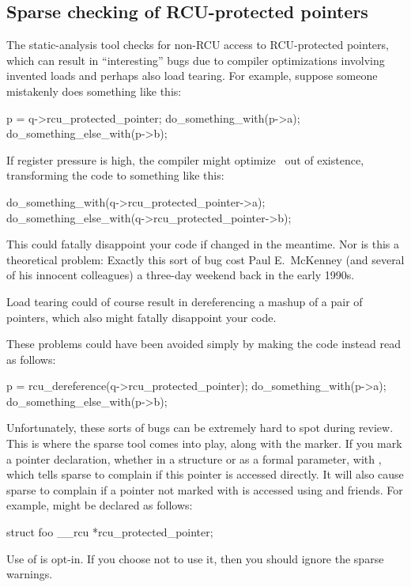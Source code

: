 \subsection{Sparse checking of RCU-protected pointers}
\label{sec:rcu:Sparse checking of RCU-protected pointers}

The  static-analysis tool checks for non-RCU access to RCU-protected
pointers, which can result in ``interesting'' bugs due to compiler
optimizations involving invented loads and perhaps also load tearing.
For example, suppose someone mistakenly does something like this:

\begin{VerbatimU}
	p = q->rcu_protected_pointer;
	do_something_with(p->a);
	do_something_else_with(p->b);
\end{VerbatimU}

If register pressure is high, the compiler might optimize~ out
of existence, transforming the code to something like this:

\begin{VerbatimU}
	do_something_with(q->rcu_protected_pointer->a);
	do_something_else_with(q->rcu_protected_pointer->b);
\end{VerbatimU}

This could fatally disappoint your code if 
changed in the meantime.
Nor is this a theoretical problem:
Exactly
this sort of bug cost Paul E.~McKenney (and several of his innocent
colleagues) a three-day weekend back in the early 1990s.

Load tearing could of course result in dereferencing a mashup of a pair
of pointers, which also might fatally disappoint your code.

These problems could have been avoided simply by making the code instead
read as follows:

\begin{VerbatimU}
	p = rcu_dereference(q->rcu_protected_pointer);
	do_something_with(p->a);
	do_something_else_with(p->b);
\end{VerbatimU}

Unfortunately, these sorts of bugs can be extremely hard to spot during
review.
This is where the sparse tool comes into play, along with the
 marker.
If you mark a pointer declaration, whether in a structure
or as a formal parameter, with , which tells sparse to complain if
this pointer is accessed directly.
It will also cause sparse to complain
if a pointer not marked with  is accessed using 
and friends.
For example,  might be declared as
follows:

\begin{VerbatimU}
	struct foo __rcu *rcu_protected_pointer;
\end{VerbatimU}

Use of  is opt-in.
If you choose not to use it, then you should
ignore the sparse warnings.
